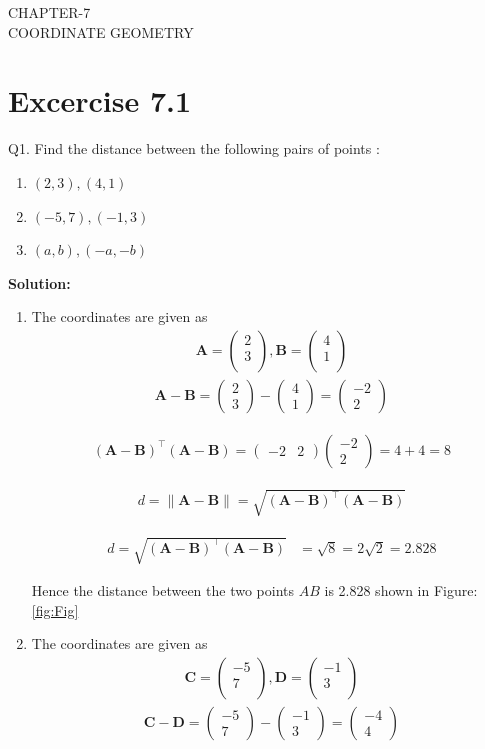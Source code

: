 \documentclass[12pt]{article}
\providecommand{\brak}[1]{\ensuremath{\left(#1\right)}}
\newcommand{\solution}{\noindent \textbf{Solution: }}
\newcommand{\myvec}[1]{\ensuremath{\begin{pmatrix}#1\end{pmatrix}}}
\let\vec\mathbf
\begin{document}
\begin{center}
\textbf\large{CHAPTER-7 \\ COORDINATE GEOMETRY}
\end{center}
\section*{Excercise 7.1}

Q1. Find the distance between the following pairs of points :
\begin{enumerate}
	\item $\brak{2,3}, \brak{4,1}$ 
	\item $\brak{-5,7}, \brak{-1,3}$
	\item $\brak{a,b}, \brak{-a,-b}$
\end{enumerate}
\solution
\begin{enumerate}
\item The coordinates are given as
	\begin{align}
	\vec{A} = \myvec{
		2\\
		3\\
		},
	\vec{B} = \myvec{
		4\\
		1\\
		}
	\end{align}
	\begin{align}
		\vec{A} - \vec{B} = \myvec{2\\3} - \myvec{4\\1} = \myvec{-2\\2}		
	\end{align}
	
	
	
	\begin{align}
		(\vec{A}-\vec{B})^\top (\vec{A}-\vec{B}) = \myvec{-2&2} \myvec{-2\\2} = 4+4 = 8
	\end{align}
	
	\begin{align}
		d=\lVert \vec{A}-\vec{B} \rVert=\sqrt{\brak{\vec{A} -\vec{B}}^{\top}\brak{\vec{A} -\vec{B}}}
	\end{align}

\begin{align}
d=\sqrt{\brak{\vec{A} -\vec{B}}^{\top}\brak{\vec{A} -\vec{B}}}
 &=\sqrt{8}=2\sqrt{2}=2.828
\end{align}	
	
	Hence the distance between the two points $AB$ is 2.828  shown in Figure:\ref{fig:Fig}


\item The coordinates are given as
	\begin{align}
	\vec{C} = \myvec{
		-5\\
		7\\
		},
	\vec{D} = \myvec{
		-1\\
		3\\
		}
	\end{align}
	\begin{align}
		\vec{C} - \vec{D} = \myvec{-5\\7} - \myvec{-1\\3} = \myvec{-4\\4}		
	\end{align}
	

\end{enumerate}
\end{document}
